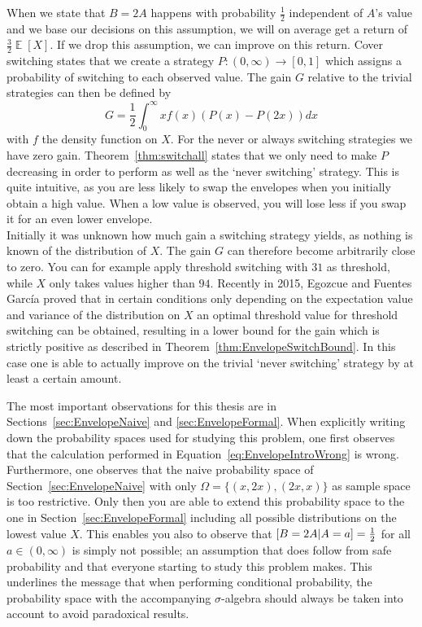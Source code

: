 \documentclass[a4paper]{report}
\theoremstyle{plain}
\theoremstyle{definition}
\theoremstyle{remark}
\numberwithin{equation}{chapter}
\let\P\relax
\DeclareMathOperator{\P}{\mathbb{P}}
\DeclareMathOperator{\E}{\mathbb{E}}
\DeclareMathOperator{\1}{\mathbbm{1}}
\begin{document}
When we state that $B=2A$ happens with probability $\frac{1}{2}$ independent of $A$'s value and we base our decisions on this assumption, we will on average get a return of $\frac{3}{2}\E[X]$. If we drop this assumption, we can improve on this return. Cover switching states that we create a strategy $P\colon(0,\infty)\to[0,1]$ which assigns a probability of switching to each observed value. The gain $G$ relative to the trivial strategies can then be defined by
\begin{equation}
G=\frac{1}{2}\int_0^\infty xf(x)(P(x)-P(2x))dx
\end{equation}
with $f$ the density function on $X$. For the never or always switching strategies we have zero gain. Theorem~\ref{thm:switchall} states that we only need to make $P$ decreasing in order to perform as well as the `never switching' strategy. This is quite intuitive, as you are less likely to swap the envelopes when you initially obtain a high value. When a low value is observed, you will lose less if you swap it for an even lower envelope.\\
Initially it was unknown how much gain a switching strategy yields, as nothing is known of the distribution of $X$. The gain $G$ can therefore become arbitrarily close to zero. You can for example apply threshold switching with $31$ as threshold, while $X$ only takes values higher than $94$. Recently in 2015, Egozcue and Fuentes García \cite{Egozcue15} proved that in certain conditions only depending on the expectation value and variance of the distribution on $X$ an optimal threshold value for threshold switching can be obtained, resulting in a lower bound for the gain which is strictly positive as described in Theorem~\ref{thm:EnvelopeSwitchBound}. In this case one is able to actually improve on the trivial `never switching' strategy by at least a certain amount.

The most important observations for this thesis are in Sections~\ref{sec:EnvelopeNaive} and \ref{sec:EnvelopeFormal}. When explicitly writing down the probability spaces used for studying this problem, one first observes that the calculation performed in Equation~\ref{eq:EnvelopeIntroWrong} is wrong. Furthermore, one observes that the naive probability space of Section~\ref{sec:EnvelopeNaive} with only $\Omega=\{(x,2x),(2x,x)\}$ as sample space is too restrictive. Only then you are able to extend this probability space to the one in Section~\ref{sec:EnvelopeFormal} including all possible distributions on the lowest value $X$. This enables you also to observe that $\P[B=2A|A=a]=\frac{1}{2}$ for all $a\in(0,\infty)$ is simply not possible; an assumption that does follow from safe probability and that everyone starting to study this problem makes. This underlines the message that when performing conditional probability, the probability space with the accompanying $\sigma$-algebra should always be taken into account to avoid paradoxical results.
\end{document}

